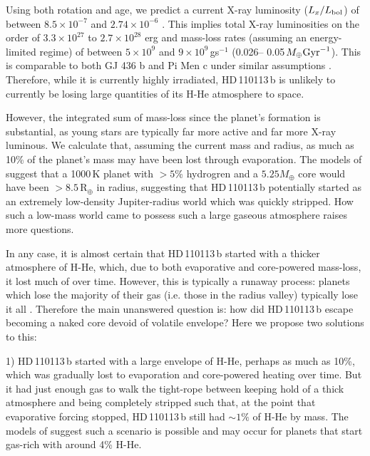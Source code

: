 \documentclass[fleqn,usenatbib]{mnras}
\newcommand{\rearth}{R$_{\oplus}$}
\newcommand{\Tplanet}{HD\,110113\,b}
\begin{document}
Using both rotation and age, we predict a current X-ray luminosity ($L_x/L_{\rm bol}$) of between $8.5\times10^{-7}$ \citep[with Prot;][]{wright2018stellar} and $2.74\times10^{-6}$ \citep[with age;][]{jackson2012coronal}.
This implies total X-ray luminosities on the order of $3.3\times10^{27}$ to $2.7\times10^{28}$ erg and mass-loss rates (assuming an energy-limited regime) of between $5\times10^{9}$ and $9\times10^{9}$\,gs$^{-1}$ (0.026-- 0.05\,$M_\oplus {\rm Gyr}^{-1}$).
This is comparable to both GJ 436 b and Pi Men c under similar assumptions \citep{king2019xuv}.
Therefore, while it is currently highly irradiated, \Tplanet{} is unlikely to currently be losing large quantities of its H-He atmosphere to space.

However, the integrated sum of mass-loss since the planet's formation is substantial, as young stars are typically far more active and far more X-ray luminous.
We calculate that, assuming the current mass and radius, as much as 10\% of the planet's mass may have been lost through evaporation.
The models of \citet{zeng2019growth} suggest that a 1000\,K planet with $>5$\% hydrogren and a $5.25M_\oplus$ core would have been $>8.5$\,\rearth{} in radius, suggesting that \Tplanet{} potentially started as an extremely low-density Jupiter-radius world which was quickly stripped.
How such a low-mass world came to possess such a large gaseous atmosphere raises more questions.

In any case, it is almost certain that \Tplanet{} started with a thicker atmosphere of H-He, which, due to both evaporative and core-powered mass-loss, it lost much of over time.
However, this is typically a runaway process: planets which lose the majority of their gas (i.e. those in the radius valley) typically lose it all \citep{owen2017evaporation}.
Therefore the main unanswered question is: how did \Tplanet{} escape becoming a naked core devoid of volatile envelope?
Here we propose two solutions to this:

1) \Tplanet{} started with a large envelope of H-He, perhaps as much as 10\%, which was gradually lost to evaporation and core-powered heating over time. 
But it had just enough gas to walk the tight-rope between keeping hold of a thick atmosphere and being completely stripped such that, at the point that evaporative forcing stopped, \Tplanet{} still had $\sim1\%$ of H-He by mass.
The models of \citet[][Figure 4]{rogers2020unveiling} suggest such a scenario is possible and may occur for planets that start gas-rich with around 4\% H-He.
\end{document}
